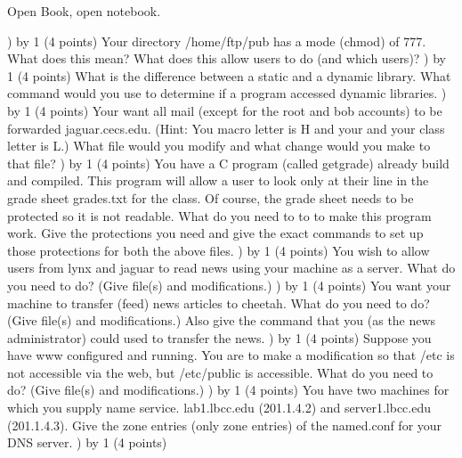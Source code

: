 
\parindent=0in
\nopagenumbers
\newcount\quesno
{}
\def\ques{\number\quesno) \advance\quesno by 1}
\def\aspace{\vskip 1.5in}

Open Book, open notebook.

\ques
(4 points)
Your directory {\ltt{}/home/ftp/pub} has a mode ({\ltt{}chmod}) of 777.
What does this mean? What does this allow users to do (and which users)?
\vskip 2.0in
\ques
(4 points)
What is the difference between a static and a dynamic library.
What command would you use to determine if a program
accessed dynamic libraries.
\vskip 1.0in
\ques
(4 points)
Your want all mail (except for the {\ltt{}root} and {\ltt{}bob}
accounts) to be forwarded {\ltt{}jaguar.cecs.edu}.
(Hint: You macro letter is {\ltt{}H} and your and
your class letter is {\ltt{}L}.)
What file would you modify and what change would you make to that file?
\vskip 1.2in
\ques
(4 points)
You have a C program (called {\ltt{}getgrade}) already build and compiled.
This program will allow a user to look only at their line in the
grade sheet {\ltt{}grades.txt} for the class.
Of course, the grade sheet needs to be protected so it is not readable.
What do you need to to to make this program work.
Give the protections you need and give the exact commands to
set up those protections for both the above files.
\vskip 1.0in
\ques
(4 points)
You wish to allow users from {\ltt{}lynx} and {\ltt{}jaguar} to
read news using your machine as a server.
What do you need to do? (Give file(s) and modifications.)
\vskip 0.8in
\vfill\eject
\ques
(4 points)
You want your machine to transfer (feed) news articles to {\ltt{}cheetah}.
What do you need to do?
(Give file(s) and modifications.)
Also give the command that you (as the news administrator) could used to 
transfer the news.
\vskip 1.9in
\ques
(4 points)
Suppose you have www configured and running. You are to make a
modification so that {\ltt{}/etc} is not accessible
via the web, but {\ltt{}/etc/public} is accessible.
What do you need to do? (Give file(s) and modifications.)
\vskip 1.5in
\ques
(4 points)
You have two machines for which you supply name service.
{\ltt{}lab1.lbcc.edu} (201.1.4.2) and 
{\ltt{}server1.lbcc.edu} (201.1.4.3).
Give the zone entries (only zone entries) of the {\ltt{}named.conf}
for your DNS server.
\vfill
\eject
\ques
(4 points)
